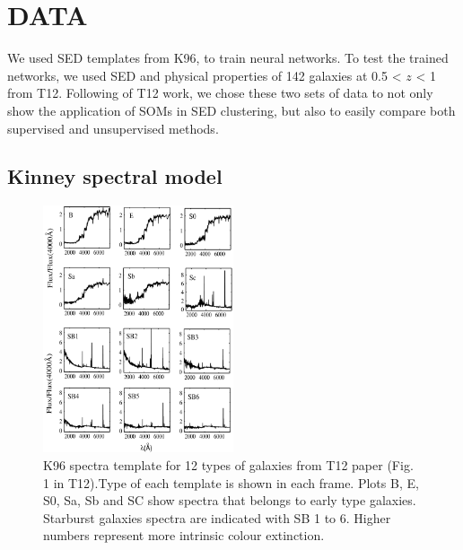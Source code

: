 
\section{DATA}
\label{sec: data}
We used SED templates from K96, to train neural networks.
To test the trained networks, we used SED and physical properties of 142 galaxies at 0.5 < $z$ < 1 from T12.
Following of T12 work, we chose these two sets of data to not only show the application of SOMs in SED clustering, but also to easily compare both supervised and unsupervised methods.

 \subsection{Kinney spectral model}
     \begin{figure}
        \centering
        \includegraphics[width=0.5\textwidth]{../images/k96.jpg}
        \caption{K96 spectra template for 12 types of galaxies from T12 paper (Fig. 1 in T12).Type of each template is shown in each frame. Plots B, E, S0, Sa, Sb and SC show spectra that belongs to early type galaxies. Starburst galaxies spectra are indicated with SB 1 to 6. Higher numbers represent more intrinsic colour extinction.}
        \label{fig: k96}
    \end{figure}
      
